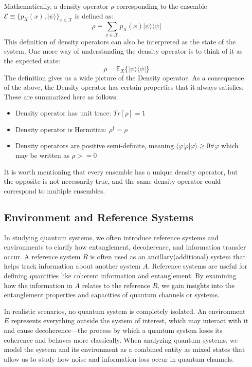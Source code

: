 Mathematically, a density operator $\rho$ corresponding to the ensemble $\mathcal{E} \equiv
\{p_X(x), |\psi\rangle \}_{x \in \mathcal{X}}$ is defined as:
\begin{equation*}
    \rho \equiv \displaystyle\sum_{x \in \mathcal{X} } p_X(x) |\psi \rangle \langle \psi|
\end{equation*}
This definition of density operators can also be interpreted as the state of the system. One
more way of understanding the density operator is to think of it as the expected state:
\begin{equation*}
    \rho = \mathbb{E}_X \{ |\psi \rangle \langle \psi| \}
\end{equation*}
The definition gives us a wide picture of the Density operator. As a consequence of the above,
the Density operator has certain properties that it always satisfies. These are summarized here
as follows:
\begin{itemize}
    \item Density operator has unit trace: $Tr[\rho] = 1$
    \item Density operator is Hermitian: $\rho^\dagger = \rho$
    \item Density operators are positive semi-definite, meaning $\langle \varphi  | \rho | \varphi \rangle \geq 0
    \forall \varphi$ which may be written as $\rho >= 0$
\end{itemize}
It is worth mentioning that every ensemble has a unique density operator, but the opposite
is not necessarily true, and the same density operator could correspond to multiple ensembles.

\subsection{Environment and Reference Systems}

In studying quantum systems, we often introduce reference systems and environments to clarify
how entanglement, decoherence, and information transfer occur. A reference system $R$ is often
used as an ancillary(additional) system that helps track information about another system $A$.
Reference systems are useful for defining quantities like coherent information and entanglement.
By examining how the information in $A$ relates to the reference $R$, we gain insights into the
entanglement properties and capacities of quantum channels or systems.

In realistic scenarios,
no quantum system is completely isolated. An environment $E$ represents everything outside the
system of interest, which may interact with it and cause decoherence—the process by which a quantum
system loses its coherence and behaves more classically. When analyzing quantum systems, we model
the system and its environment as a combined entity as mixed states that allow us to study how
noise and information loss occur in quantum channels.

